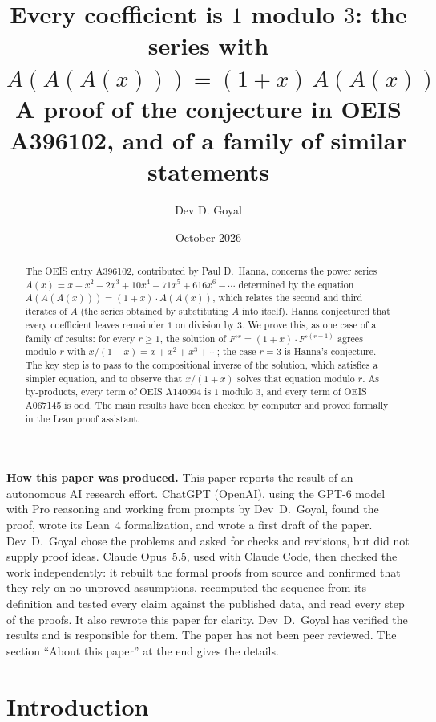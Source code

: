 \documentclass[11pt,a4paper]{article}
\title{Every coefficient is $1$ modulo $3$: the series with $A(A(A(x)))=(1+x)\,A(A(x))$\\[6pt]\large A proof of the conjecture in OEIS A396102, and of a family of similar statements}
\author{Dev D. Goyal}
\date{October 2026}
\theoremstyle{definition}
\theoremstyle{remark}
\begin{document}
\maketitle
\begin{abstract}
The OEIS entry A396102, contributed by Paul D.~Hanna, concerns the power series
$A(x)=x+x^2-2x^3+10x^4-71x^5+616x^6-\cdots$ determined by the equation $A(A(A(x)))=(1+x)\cdot A(A(x))$, which relates
the second and third iterates of $A$ (the series obtained by substituting $A$ into itself). Hanna conjectured that
every coefficient leaves remainder $1$ on division by $3$. We prove this, as one case of a family of results: for every
$r\ge1$, the solution of $F^{\circ r}=(1+x)\cdot F^{\circ(r-1)}$ agrees modulo $r$ with $x/(1-x)=x+x^2+x^3+\cdots$; the
case $r=3$ is Hanna's conjecture. The key step is to pass to the compositional inverse of the solution, which satisfies
a simpler equation, and to observe that $x/(1+x)$ solves that equation modulo $r$. As by-products, every term of OEIS
A140094 is $1$ modulo $3$, and every term of OEIS A067145 is odd. The main results have been checked by computer and
proved formally in the Lean proof assistant.
\end{abstract}
\begin{center}\begin{minipage}{0.88\linewidth}\small
\textbf{How this paper was produced.} This paper reports the result of an autonomous AI research effort.
ChatGPT (OpenAI), using the GPT-6 model with Pro reasoning and working from prompts by Dev~D.~Goyal, found the proof, wrote its Lean~4 formalization, and wrote a first draft of the paper.
Dev~D.~Goyal chose the problems and asked for checks and revisions, but did not supply proof ideas.
Claude Opus~5.5, used with Claude Code, then checked the work independently: it rebuilt the formal proofs from
source and confirmed that they rely on no unproved assumptions, recomputed the sequence from its definition and tested
every claim against the published data, and read every step of the proofs. It also rewrote this paper for clarity.
Dev~D.~Goyal has verified the results and is responsible for them. The paper has not been peer reviewed.
The section ``About this paper'' at the end gives the details.
\end{minipage}\end{center}

\section{Introduction}
\end{document}
